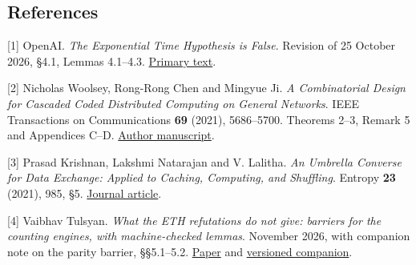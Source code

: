 \documentclass[
  10pt,
]{article}
\begin{document}
\subsection{References}\label{references}

{[}1{]} OpenAI. \emph{The Exponential Time Hypothesis is False}.
Revision of 25 October 2026, §4.1, Lemmas 4.1--4.3.
\href{https://raw.githubusercontent.com/openai/math/main/preprints/The-Exponential-Time-Hypothesis-is-False-October-25-2026/build/main_full_version.tex}{Primary
text}.

{[}2{]} Nicholas Woolsey, Rong-Rong Chen and Mingyue Ji. \emph{A
Combinatorial Design for Cascaded Coded Distributed Computing on General
Networks}. IEEE Transactions on Communications \textbf{69} (2021),
5686--5700. Theorems 2--3, Remark 5 and Appendices C--D.
\href{https://arxiv.org/pdf/2008.00581}{Author manuscript}.

{[}3{]} Prasad Krishnan, Lakshmi Natarajan and V. Lalitha. \emph{An
Umbrella Converse for Data Exchange: Applied to Caching, Computing, and
Shuffling}. Entropy \textbf{23} (2021), 985, §5.
\href{https://doi.org/10.3390/e23080985}{Journal article}.

{[}4{]} Vaibhav Tulsyan. \emph{What the ETH refutations do not give:
barriers for the counting engines, with machine-checked lemmas}.
November 2026, with companion note on the parity barrier, §§5.1--5.2.
\href{https://hexagonmath.org/pdf/2611.00149v1}{Paper} and
\href{https://github.com/xennygrimmato/eth-hamiltonicity/blob/946c49993b78aa163fcac3f8cb78ce351dd5dcc6/research/permanent/parity-barrier.md}{versioned
companion}.
\end{document}
